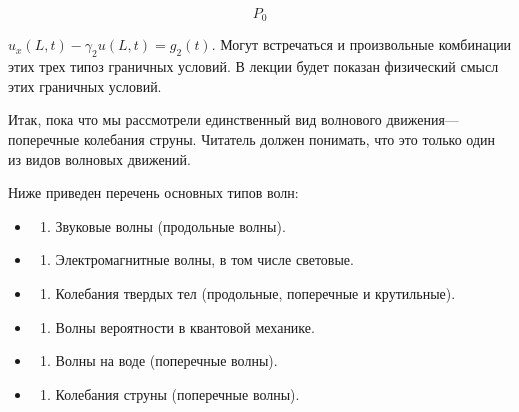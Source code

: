 \documentclass[
  ukrainian,
]{article}
\providecommand{\tightlist}{%
  \setlength{\itemsep}{0pt}\setlength{\parskip}{0pt}}
\begin{document}
\[
P_{0}
\]

\(u_x(L, t) - \gamma_2 u(L, t) = g_2(t).\) Могут встречаться и
произвольные комбинации этих трех типоз граничных условий. В лекции
будет показан физический смысл этих граничных условий.

Итак, пока что мы рассмотрели единственный вид волнового
движения---поперечные колебания струны. Читатель должен понимать, что
это только один из видов волновых движений.

Ниже приведен перечень основных типов волн:

\begin{itemize}
\tightlist
\item
  \begin{enumerate}
  \def\labelenumi{\arabic{enumi}.}
  \tightlist
  \item
    Звуковые волны (продольные волны).
  \end{enumerate}
\item
  \begin{enumerate}
  \def\labelenumi{\arabic{enumi}.}
  \setcounter{enumi}{1}
  \tightlist
  \item
    Электромагнитные волны, в том числе световые.
  \end{enumerate}
\item
  \begin{enumerate}
  \def\labelenumi{\arabic{enumi}.}
  \setcounter{enumi}{2}
  \tightlist
  \item
    Колебания твердых тел (продольные, поперечные и крутильные).
  \end{enumerate}
\item
  \begin{enumerate}
  \def\labelenumi{\arabic{enumi}.}
  \setcounter{enumi}{3}
  \tightlist
  \item
    Волны вероятности в квантовой механике.
  \end{enumerate}
\item
  \begin{enumerate}
  \def\labelenumi{\arabic{enumi}.}
  \setcounter{enumi}{4}
  \tightlist
  \item
    Волны на воде (поперечные волны).
  \end{enumerate}
\item
  \begin{enumerate}
  \def\labelenumi{\arabic{enumi}.}
  \setcounter{enumi}{5}
  \tightlist
  \item
    Колебания струны (поперечные волны).
  \end{enumerate}
\end{itemize}
\end{document}
